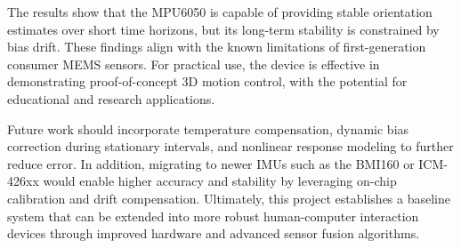 \documentclass[10pt]{article}
\begin{document}
The results show that the MPU6050 is capable of providing stable orientation 
estimates over short time horizons, but its long-term stability is constrained 
by bias drift. These findings align with the known limitations of 
first-generation consumer MEMS sensors. For practical use, the device is 
effective in demonstrating proof-of-concept 3D motion control, with the 
potential for educational and research applications. 

Future work should incorporate temperature compensation, dynamic bias correction 
during stationary intervals, and nonlinear response modeling to further reduce 
error. In addition, migrating to newer IMUs such as the BMI160 or ICM-426xx 
would enable higher accuracy and stability by leveraging on-chip calibration 
and drift compensation. Ultimately, this project establishes a baseline system 
that can be extended into more robust human-computer interaction devices through 
improved hardware and advanced sensor fusion algorithms.
\end{document}

